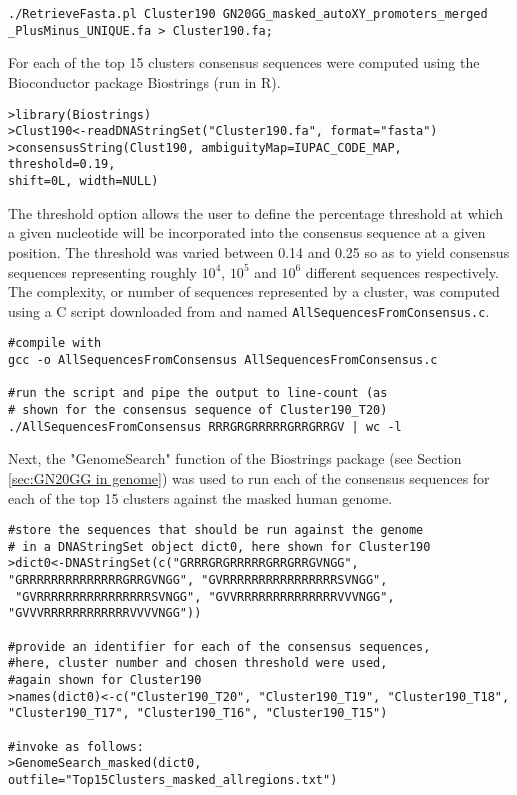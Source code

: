 \begin{small}\begin{lstlisting}
./RetrieveFasta.pl Cluster190 GN20GG_masked_autoXY_promoters_merged
_PlusMinus_UNIQUE.fa > Cluster190.fa;
\end{lstlisting}\end{small}

For each of the top 15 clusters consensus sequences were computed using the Bioconductor package Biostrings (run in R).

\begin{small}\begin{lstlisting}
>library(Biostrings)
>Clust190<-readDNAStringSet("Cluster190.fa", format="fasta") 
>consensusString(Clust190, ambiguityMap=IUPAC_CODE_MAP, threshold=0.19,
shift=0L, width=NULL) 
\end{lstlisting}\end{small}

The threshold option allows the user to define the percentage threshold at which a given nucleotide will be incorporated into the consensus sequence at a given position. The threshold was varied between 0.14 and 0.25 so as to yield consensus sequences representing roughly $10^4$, $10^5$ and $10^6$ different sequences respectively. The complexity, or number of sequences represented by a cluster, was computed using a C script downloaded from \cite{Lindenbaum:Online} and named \verb|AllSequencesFromConsensus.c|.

\begin{small}\begin{lstlisting}
#compile with
gcc -o AllSequencesFromConsensus AllSequencesFromConsensus.c

#run the script and pipe the output to line-count (as 
# shown for the consensus sequence of Cluster190_T20)
./AllSequencesFromConsensus RRRGRGRRRRRGRRGRRGV | wc -l
\end{lstlisting}\end{small}

Next, the "GenomeSearch" function of the Biostrings package (see Section \ref{sec:GN20GG in genome}) was used to run each of the consensus sequences for each of the top 15 clusters against the masked human genome. 

\begin{small}\begin{lstlisting}
#store the sequences that should be run against the genome
# in a DNAStringSet object dict0, here shown for Cluster190
>dict0<-DNAStringSet(c("GRRRGRGRRRRRGRRGRRGVNGG", 
"GRRRRRRRRRRRRRRGRRGVNGG", "GVRRRRRRRRRRRRRRRRSVNGG",
 "GVRRRRRRRRRRRRRRRRSVNGG", "GVVRRRRRRRRRRRRRRVVVNGG", "GVVVRRRRRRRRRRRRVVVVNGG"))

#provide an identifier for each of the consensus sequences,
#here, cluster number and chosen threshold were used, 
#again shown for Cluster190 
>names(dict0)<-c("Cluster190_T20", "Cluster190_T19", "Cluster190_T18", "Cluster190_T17", "Cluster190_T16", "Cluster190_T15")

#invoke as follows:
>GenomeSearch_masked(dict0, outfile="Top15Clusters_masked_allregions.txt")
\end{lstlisting}\end{small}

